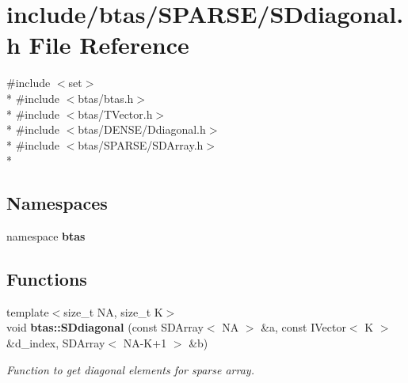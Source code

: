 \section{include/btas/\-S\-P\-A\-R\-S\-E/\-S\-Ddiagonal.h File Reference}
\label{d8/d3e/SDdiagonal_8h}
{\ttfamily \#include $<$set$>$}\\*
{\ttfamily \#include $<$btas/btas.\-h$>$}\\*
{\ttfamily \#include $<$btas/\-T\-Vector.\-h$>$}\\*
{\ttfamily \#include $<$btas/\-D\-E\-N\-S\-E/\-Ddiagonal.\-h$>$}\\*
{\ttfamily \#include $<$btas/\-S\-P\-A\-R\-S\-E/\-S\-D\-Array.\-h$>$}\\*
\subsection*{Namespaces}
\begin{DoxyCompactItemize}
\item 
namespace {\bf btas}
\end{DoxyCompactItemize}
\subsection*{Functions}
\begin{DoxyCompactItemize}
\item 
{\footnotesize template$<$size\-\_\-t N\-A, size\-\_\-t K$>$ }\\void {\bf btas\-::\-S\-Ddiagonal} (const S\-D\-Array$<$ N\-A $>$ \&a, const I\-Vector$<$ K $>$ \&d\-\_\-index, S\-D\-Array$<$ N\-A-\/K+1 $>$ \&b)
\begin{DoxyCompactList}\small\item\em Function to get diagonal elements for sparse array. \end{DoxyCompactList}\end{DoxyCompactItemize}
